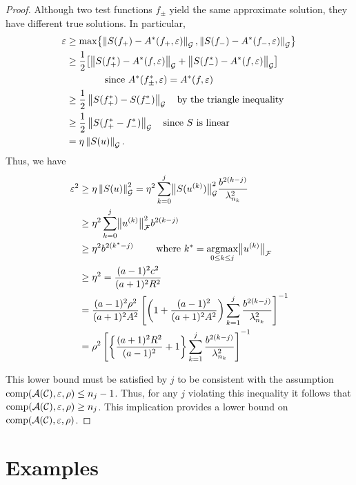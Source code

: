 \documentclass[final]{elsarticle}
\theoremstyle{definition}
\theoremstyle{remark}
\begin{document}
\begin{proof}
Although two test functions $f_\pm$ yield the same approximate solution, they have different true solutions.  In particular,
\begin{align*}
\varepsilon &\ge \max \bigl\{\norm[\cg]{S(f_+) - A^*(f_+,\varepsilon)}, \norm[\cg]{S(f_-) - A^*(f_-,\varepsilon)} \bigr\} \\
&\ge \frac 12 \bigl[\norm[\cg]{S(f^*_+) - A^*(f,\varepsilon)} + \norm[\cg]{S(f^*_-) - A^*(f,\varepsilon)}  \bigr] \\
&\qquad \qquad \text{since } A^*(f^*_\pm,\varepsilon) = A^*(f,\varepsilon) \\
&\ge \frac 12 \norm[\cg]{S(f^*_+) - S(f^*_-)} \quad \text{by the triangle inequality}\\
&\ge \frac 12 \norm[\cg]{S(f^*_+ - f^*_-)} \quad \text{since $S$ is linear}\\
&= \eta \norm[\cg]{S(u)}.
\end{align*}
Thus, we have
\begin{align*}
\varepsilon^2  & \ge \eta \norm[\cg]{S(u)}^2= 
\eta^2 \sum_{k=0}^{j} \bignorm[\cg]{S(u^{(k)})}^2  \frac{b^{2(k-j)}}{\lambda_{n_k}^2}\\
& \ge \eta^2 
\sum_{k=0}^{j} \bignorm[\cf]{u^{(k)}}^2 
b^{2(k-j)}\\
& \ge  \eta^2 b^{2(k^{*}-j)} \qquad \text{ where } k^* = \argmax_{0 \le k \le j} \bignorm[\cf]{u^{(k)}} \\
& \ge \eta^2 = \frac{(a-1)^2c^2}{(a+1)^2R^2} \\
&
=\frac{(a-1)^2 \rho^2}{(a+1)^2A^2}\left[\left(1+\frac{(a-1)^2}{(a+1)^{2} A^2 }\right)\sum_{k=1}^j \frac{b^{2(k-j)}}{\lambda_{n_{k}}^2}\right]^{-1} \\
& = \rho^2 \left[\left\{\frac{(a+1)^{2} R^2 }{(a-1)^2} + 1\right\}\sum_{k=1}^j \frac{b^{2(k-j)}}{\lambda_{n_{k}}^2}\right]^{-1} 
\end{align*}

This lower bound must be satisfied by $j$ to be consistent with the assumption $\comp(\ca(\cc),\varepsilon,\rho) \le n_j - 1$.  Thus, for any $j$ violating this inequality it follows that $\comp(\ca(\cc),\varepsilon,\rho) \ge n_j$.  This implication provides a lower bound on $\comp(\ca(\cc),\varepsilon,\rho)$.
\end{proof}



\section{Examples} \label{sec:examp}
\end{document}

